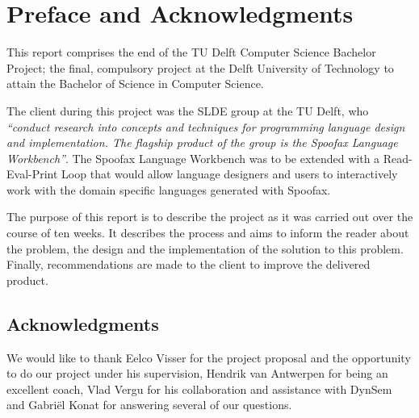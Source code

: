 \chapter{Preface and Acknowledgments}
\label{cha:preface-acks}

This report comprises the end of the TU Delft Computer Science Bachelor Project;
the final, compulsory project at the Delft University of Technology to attain
the Bachelor of Science in Computer Science.

The client during this project was the SLDE group at the TU Delft, who
\textit{``conduct research into concepts and techniques for programming language
design and implementation. The flagship product of the group is the Spoofax
Language Workbench''}. The Spoofax Language Workbench was to be extended with a
Read-Eval-Print Loop that would allow language designers and users to
interactively work with the domain specific languages generated with Spoofax.

The purpose of this report is to describe the project as it was carried out over
the course of ten weeks. It describes the process and aims to
inform the reader about the problem, the design and the implementation of the
solution to this problem. Finally, recommendations are made to the client to
improve the delivered product.

\section*{Acknowledgments}

We would like to thank Eelco Visser for the project proposal and the
opportunity to do our project under his supervision, Hendrik van Antwerpen for
being an excellent coach, Vlad Vergu for his collaboration and assistance with
DynSem and Gabri\"el Konat for answering several of our questions.

